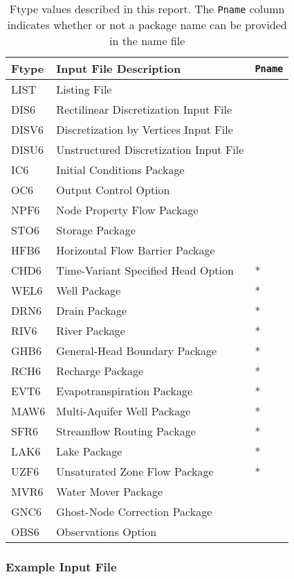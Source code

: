 \begin{table}[H]
\caption{Ftype values described in this report.  The \texttt{Pname} column indicates whether or not a package name can be provided in the name file}
\small
\begin{center}
\begin{tabular*}{\columnwidth}{l l l}
\hline
\hline
Ftype & Input File Description & \texttt{Pname}\\
\hline
LIST & Listing File \\
DIS6 & Rectilinear Discretization Input File \\
DISV6 & Discretization by Vertices Input File \\
DISU6 & Unstructured Discretization Input File \\
IC6 & Initial Conditions Package \\
OC6 & Output Control Option \\
NPF6 & Node Property Flow Package \\ 
STO6 & Storage Package \\
HFB6 & Horizontal Flow Barrier Package\\
CHD6 & Time-Variant Specified Head Option & * \\
WEL6 & Well Package & * \\
DRN6 & Drain Package & * \\
RIV6 & River Package & * \\
GHB6 & General-Head Boundary Package & * \\
RCH6 & Recharge Package & * \\
EVT6 & Evapotranspiration Package & * \\
MAW6 & Multi-Aquifer Well Package & * \\
SFR6 & Streamflow Routing Package & * \\
LAK6 & Lake Package & * \\
UZF6 & Unsaturated Zone Flow Package & * \\
MVR6 & Water Mover Package \\
GNC6 & Ghost-Node Correction Package \\
OBS6 & Observations Option \\
\hline 
\end{tabular*}
\label{table:ftype}
\end{center}
\normalsize
\end{table}

\vspace{5mm}
\subsubsection{Example Input File}


